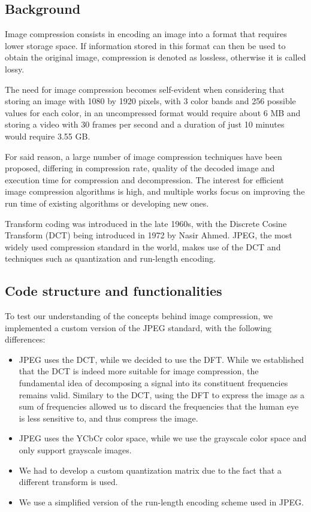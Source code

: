 \subsection{Background}
Image compression consists in encoding an image into a format that requires lower storage space. If information stored in this format can then be used to obtain the original image, compression is denoted as lossless, otherwise it is called lossy. 

The need for image compression becomes self-evident when considering that storing an image with 1080 by 1920 pixels, with 3 color bands and 256 possible values for each color, in an uncompressed format would require about 6 MB and storing a video with 30 frames per second and a duration of just 10 minutes would require 3.55 GB. 

For said reason, a large number of image compression techniques have been proposed\cite{compression_list_1}\cite{compression_list_2}\cite{compression_wavelet}, differing in compression rate, quality of the decoded image and execution time for compression and decompression. The interest for efficient image compression algorithms is high, and multiple works focus on improving the run time of existing algorithms or developing new ones\cite{compression_optimize_1}\cite{compression_optimize_2}.

Transform coding was introduced in the late 1960s, with the Discrete Cosine Transform (DCT) being introduced in 1972 by Nasir Ahmed\cite{dct}. JPEG\cite{jpeg}, the most widely used compression standard in the world\cite{jpeg_popular}, makes use of the DCT and techniques such as quantization and run-length encoding.

\subsection{Code structure and functionalities}
To test our understanding of the concepts behind image compression, we implemented a custom version of the JPEG standard, with the following differences:
\begin{itemize}
    \item JPEG uses the DCT, while we decided to use the DFT. While we established that the DCT is indeed more suitable for image compression, the fundamental idea of decomposing a signal into its constituent frequencies remains valid. Similary to the DCT, using the DFT to express the image as a sum of frequencies allowed us to discard the frequencies that the human eye is less sensitive to, and thus compress the image.
    \item JPEG uses the YCbCr color space, while we use the grayscale color space and only support grayscale images.
    \item We had to develop a custom quantization matrix due to the fact that a different transform is used.
    \item We use a simplified version of the run-length encoding scheme used in JPEG.
\end{itemize}


